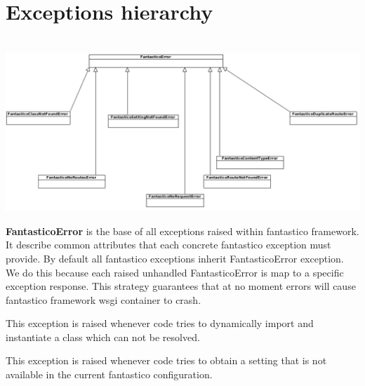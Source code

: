 \documentclass[letterpaper,10pt,english]{sphinxmanual}
\begin{document}
\section{Exceptions hierarchy}
\label{features/exceptions:exceptions-hierarchy}\label{features/exceptions::doc}

\begin{fulllineitems}
\label{features/exceptions:fantastico.exceptions.FantasticoError}~
\includegraphics{exceptions.png}

\textbf{FantasticoError} is the base of all exceptions raised within fantastico framework. It describe common attributes that
each concrete fantastico exception must provide. By default all fantastico exceptions inherit FantasticoError exception. 
We do this because each raised unhandled FantasticoError is map to a specific exception response. This strategy guarantees
that at no moment errors will cause fantastico framework wsgi container to crash.

\end{fulllineitems}


\begin{fulllineitems}
\label{features/exceptions:fantastico.exceptions.FantasticoClassNotFoundError}
This exception is raised whenever code tries to dynamically import and instantiate a class which can not be resolved.

\end{fulllineitems}


\begin{fulllineitems}
\label{features/exceptions:fantastico.exceptions.FantasticoSettingNotFoundError}
This exception is raised whenever code tries to obtain a setting that is not available in the current fantastico
configuration.

\end{fulllineitems}
\end{document}
